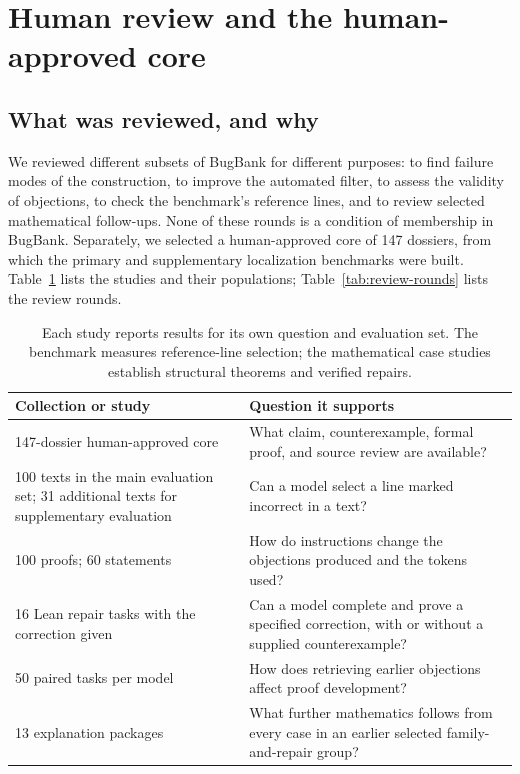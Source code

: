 \section{Human review and the human-approved core}
\label{app:recent-human-review}

\subsection{What was reviewed, and why}
We reviewed different subsets of BugBank for different purposes: to find failure modes of the construction, to improve the automated filter, to assess the validity of objections, to check the benchmark's reference lines, and to review selected mathematical follow-ups. None of these rounds is a condition of membership in BugBank. Separately, we selected a human-approved core of 147 dossiers, from which the primary and supplementary localization benchmarks were built. Table~\ref{tab:population-map} lists the studies and their populations; Table~\ref{tab:review-rounds} lists the review rounds.

\begin{table}[htbp]
\centering\small\setlength{\tabcolsep}{4pt}
\begin{tabularx}{\linewidth}{@{}p{.29\linewidth}X@{}}
\toprule
Collection or study & Question it supports\\\midrule
147-dossier human-approved core & What claim, counterexample, formal proof, and source review are available?\\
100 texts in the main evaluation set; 31 additional texts for supplementary evaluation & Can a model select a line marked incorrect in a text?\\
100 proofs; 60 statements & How do instructions change the objections produced and the tokens used?\\
16 Lean repair tasks with the correction given & Can a model complete and prove a specified correction, with or without a supplied counterexample?\\
50 paired tasks per model & How does retrieving earlier objections affect proof development?\\
13 explanation packages & What further mathematics follows from every case in an earlier selected family-and-repair group?\\
\bottomrule
\end{tabularx}
\caption{Each study reports results for its own question and evaluation set. The benchmark measures reference-line selection; the mathematical case studies establish structural theorems and verified repairs.}
\label{tab:population-map}
\end{table}

